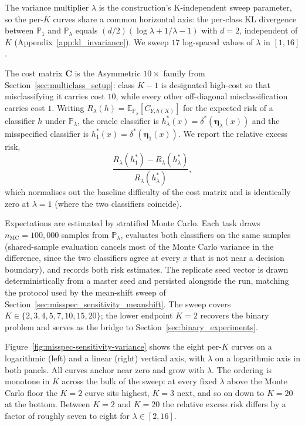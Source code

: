 The variance multiplier $\lambda$ is the construction's K-independent sweep parameter, so the per-$K$ curves share a common horizontal axis: the per-class KL divergence between $\mathbb{P}_1$ and $\mathbb{P}_\lambda$ equals $(d/2)(\log\lambda + 1/\lambda - 1)$ with $d = 2$, independent of $K$ (Appendix~\ref{app:kl_invariance}). We sweep $17$ log-spaced values of $\lambda$ in $[1, 16]$.

The cost matrix $\mathbf{C}$ is the Asymmetric $10\times$ family from Section~\ref{sec:multiclass_setup}: class $K{-}1$ is designated high-cost so that misclassifying it carries cost $10$, while every other off-diagonal misclassification carries cost $1$. Writing $R_\lambda(h) = \mathbb{E}_{\mathbb{P}_\lambda}[C_{Y, h(X)}]$ for the expected risk of a classifier $h$ under $\mathbb{P}_\lambda$, the oracle classifier is $h^*_\lambda(x) = \delta^*(\boldsymbol{\eta}_\lambda(x))$ and the misspecified classifier is $h^*_1(x) = \delta^*(\boldsymbol{\eta}_1(x))$. We report the relative excess risk,
\begin{equation}
    \frac{R_\lambda(h^*_1) - R_\lambda(h^*_\lambda)}{R_\lambda(h^*_\lambda)},
    \label{eq:misspec_sensitivity_relative_regret}
\end{equation}
which normalises out the baseline difficulty of the cost matrix and is identically zero at $\lambda = 1$ (where the two classifiers coincide).

Expectations are estimated by stratified Monte Carlo. Each task draws $n_{\mathrm{MC}} = 100{,}000$ samples from $\mathbb{P}_\lambda$, evaluates both classifiers on the same samples (shared-sample evaluation cancels most of the Monte Carlo variance in the difference, since the two classifiers agree at every $x$ that is not near a decision boundary), and records both risk estimates. The replicate seed vector is drawn deterministically from a master seed and persisted alongside the run, matching the protocol used by the mean-shift sweep of Section~\ref{sec:misspec_sensitivity_meanshift}. The sweep covers $K \in \{2, 3, 4, 5, 7, 10, 15, 20\}$; the lower endpoint $K = 2$ recovers the binary problem and serves as the bridge to Section~\ref{sec:binary_experiments}.

Figure~\ref{fig:misspec-sensitivity-variance} shows the eight per-$K$ curves on a logarithmic (left) and a linear (right) vertical axis, with $\lambda$ on a logarithmic axis in both panels. All curves anchor near zero and grow with $\lambda$. The ordering is monotone in $K$ across the bulk of the sweep: at every fixed $\lambda$ above the Monte Carlo floor the $K = 2$ curve sits highest, $K = 3$ next, and so on down to $K = 20$ at the bottom. Between $K = 2$ and $K = 20$ the relative excess risk differs by a factor of roughly seven to eight for $\lambda \in [2, 16]$.

